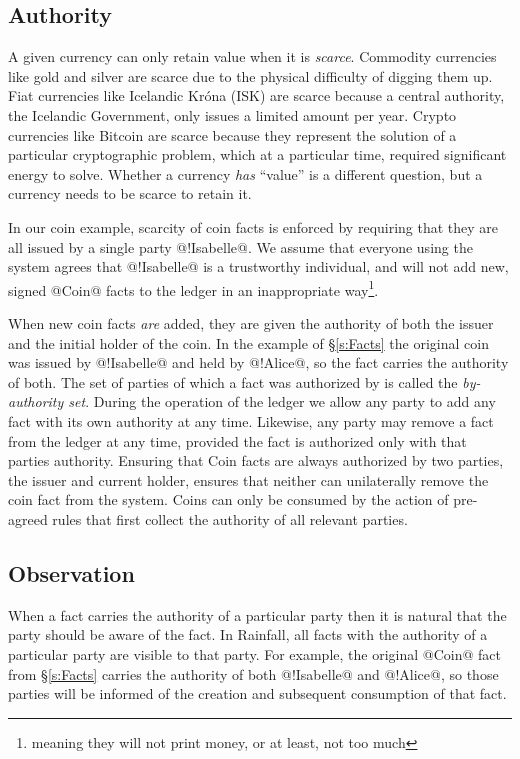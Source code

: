 \subsection{Authority}
\label{s:Authority}
A given currency can only retain value when it is \emph{scarce}. Commodity currencies like gold and silver are scarce due to the physical difficulty of digging them up. Fiat currencies like Icelandic Kr\'ona (ISK) are scarce because a central authority, the Icelandic Government, only issues a limited amount per year. Crypto currencies like Bitcoin are scarce because they represent the solution of a particular cryptographic problem, which at a particular time, required significant energy to solve. Whether a currency \emph{has} ``value'' is a different question, but a currency needs to be scarce to retain it.

In our coin example, scarcity of coin facts is enforced by requiring that they are all issued by a single party @!Isabelle@. We assume that everyone using the system agrees that @!Isabelle@ is a trustworthy individual, and will not add new, signed @Coin@ facts to the ledger in an inappropriate way\footnote{meaning they will not print money, or at least, not too much}.

When new coin facts \emph{are} added, they are given the authority of both the issuer and the initial holder of the coin. In the example of \S\ref{s:Facts} the original coin was issued by @!Isabelle@ and held by @!Alice@, so the fact carries the authority of both. The set of parties of which a fact was authorized by is called the \emph{by-authority set}. During the operation of the ledger we allow any party to add any fact with its own authority at any time. Likewise, any party may remove a fact from the ledger at any time, provided the fact is authorized only with that parties authority. Ensuring that Coin facts are always authorized by two parties, the issuer and current holder, ensures that neither can unilaterally remove the coin fact from the system. Coins can only be consumed by the action of pre-agreed rules that first collect the authority of all relevant parties.


\subsection{Observation}
\label{s:Observation}
When a fact carries the authority of a particular party then it is natural that the party should be aware of the fact. In Rainfall, all facts with the authority of a particular party are visible to that party. For example, the original @Coin@ fact from \S\ref{s:Facts} carries the authority of both @!Isabelle@ and @!Alice@, so those parties will be informed of the creation and subsequent consumption of that fact.

